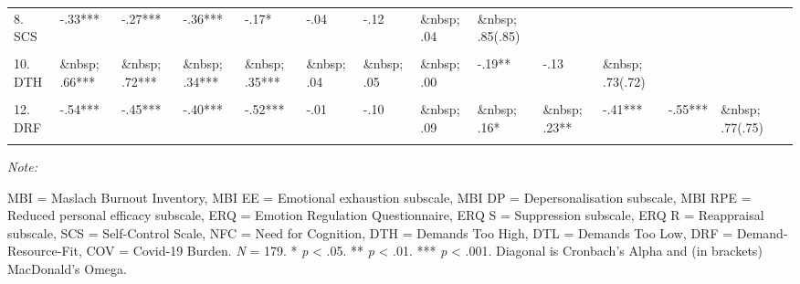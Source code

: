 \documentclass[
  english,
  man,floatsintext]{apa6}
\begin{document}
\begin{landscape}
\begin{table}
{\begin{threeparttable}
\begin{tabular}[t]{llllllllllllll}
8. SCS & -.33*** & -.27*** & -.36*** & -.17* & -.04 & -.12 & \&nbsp; .04 & \&nbsp; .85(.85) &  &  &  &  & \\
\cellcolor{gray!6}{9. NFC} & \cellcolor{gray!6}{-.24**} & \cellcolor{gray!6}{-.18*} & \cellcolor{gray!6}{-.21**} & \cellcolor{gray!6}{-.20**} & \cellcolor{gray!6}{-.02} & \cellcolor{gray!6}{-.18*} & \cellcolor{gray!6}{\&nbsp; .15*} & \cellcolor{gray!6}{\&nbsp; .20**} & \cellcolor{gray!6}{\&nbsp; .89(.88)} & \cellcolor{gray!6}{} & \cellcolor{gray!6}{} & \cellcolor{gray!6}{} & \cellcolor{gray!6}{}\\
10. DTH & \&nbsp; .66*** & \&nbsp; .72*** & \&nbsp; .34*** & \&nbsp; .35*** & \&nbsp; .04 & \&nbsp; .05 & \&nbsp; .00 & -.19** & -.13 & \&nbsp; .73(.72) &  &  & \\
\addlinespace
\cellcolor{gray!6}{11. DTL} & \cellcolor{gray!6}{\&nbsp; .44***} & \cellcolor{gray!6}{\&nbsp; .35***} & \cellcolor{gray!6}{\&nbsp; .37***} & \cellcolor{gray!6}{\&nbsp; .42***} & \cellcolor{gray!6}{\&nbsp; .01} & \cellcolor{gray!6}{\&nbsp; .16*} & \cellcolor{gray!6}{-.13} & \cellcolor{gray!6}{-.18*} & \cellcolor{gray!6}{-.15*} & \cellcolor{gray!6}{\&nbsp; .40***} & \cellcolor{gray!6}{\&nbsp; .73(.76)} & \cellcolor{gray!6}{} & \cellcolor{gray!6}{}\\
12. DRF & -.54*** & -.45*** & -.40*** & -.52*** & -.01 & -.10 & \&nbsp; .09 & \&nbsp; .16* & \&nbsp; .23** & -.41*** & -.55*** & \&nbsp; .77(.75) & \\
\cellcolor{gray!6}{13. COV} & \cellcolor{gray!6}{\&nbsp; .23**} & \cellcolor{gray!6}{\&nbsp; .32***} & \cellcolor{gray!6}{\&nbsp; .07} & \cellcolor{gray!6}{\&nbsp; .00} & \cellcolor{gray!6}{-.02} & \cellcolor{gray!6}{\&nbsp; .02} & \cellcolor{gray!6}{-.06} & \cellcolor{gray!6}{-.03} & \cellcolor{gray!6}{\&nbsp; .14} & \cellcolor{gray!6}{\&nbsp; .44***} & \cellcolor{gray!6}{\&nbsp; .08} & \cellcolor{gray!6}{-.12} & \cellcolor{gray!6}{\&nbsp; .77(.81)}\\
\bottomrule
\end{tabular}
\begin{tablenotes}
\item \textit{Note: } 
\item MBI = Maslach Burnout Inventory, MBI EE = Emotional exhaustion subscale, MBI DP = Depersonalisation subscale, MBI RPE = Reduced personal efficacy subscale, ERQ = Emotion Regulation Questionnaire, ERQ S = Suppression subscale, ERQ R = Reappraisal subscale, SCS = Self-Control Scale, NFC = Need for Cognition, DTH = Demands Too High, DTL = Demands Too Low, DRF = Demand-Resource-Fit, COV = Covid-19 Burden. \textit{N} = 179. * \textit{p} < .05. ** \textit{p} < .01. *** \textit{p} < .001. Diagonal is Cronbach's Alpha and (in brackets) MacDonald's Omega.
\end{tablenotes}
\end{threeparttable}}
\end{table}
\end{landscape}
\end{document}
